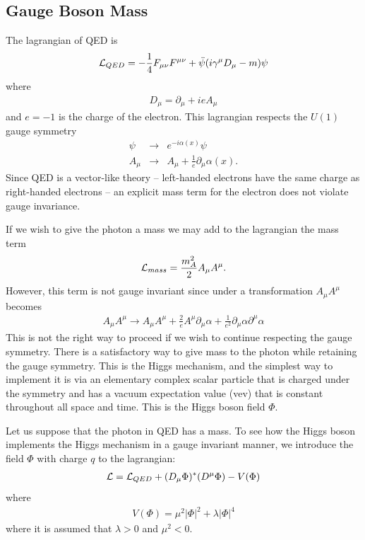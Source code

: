 \documentclass[12pt]{article}
\def\beq{\begin{eqnarray}}
\def\eeq{\end{eqnarray}}
\def\bea{\begin{eqnarray}}
\def\Dslash{\gamma^\mu D_\mu}
\begin{document}
\noindent
\subsection{Gauge Boson Mass}

The lagrangian of QED is
\beq
{\cal L}_{QED}=-\frac{1}{4}F_{\mu\nu}F^{\mu\nu}+\bar \psi (i\Dslash -m)\psi
\eeq
where 
\beq
D_\mu=\partial_\mu +ieA_\mu
\eeq
and $e=-1$ is the charge of the electron.
This lagrangian respects the $U(1)$ gauge symmetry
\bea
\psi & \to & e^{-i\alpha(x)}\psi \\
A_\mu & \to & A_\mu+\frac{1}{e}\partial_\mu \alpha(x).
\eeq
Since QED is a vector-like theory -- left-handed electrons have the same charge as right-handed electrons --  an explicit mass term for the electron does not violate gauge invariance. 

If we wish to give the photon a mass we may add to the lagrangian the mass term
\beq
{\cal L}_{mass}=\frac{m_A^2}{2}A_\mu A^\mu .
\eeq
However, this term is not gauge invariant since under a transformation $A_\mu A^\mu$ becomes
\beq
A_\mu A^\mu\to A_\mu A^\mu+\frac{2}{e}A^\mu\partial_\mu\alpha+\frac{1}{e^2}\partial_\mu \alpha\partial^\mu\alpha
\eeq
This is not the right way to proceed if we wish to continue respecting the gauge symmetry. 
There is a satisfactory way to give mass to the photon while retaining the gauge symmetry. This is the Higgs mechanism, and the simplest way to implement it is via an elementary complex scalar particle that is charged under the symmetry and has a vacuum expectation value (vev) that is constant throughout all space and time.  This is the Higgs boson field $\Phi$.

Let us suppose that the photon in QED has a mass. To see how the Higgs boson implements the Higgs mechanism in a gauge invariant manner,  we 
introduce the field $\Phi$ with charge $q$  to the lagrangian:
\beq
{\cal L}={\cal L}_{QED}+(D_\mu\Phi)^*(D^\mu \Phi)-V(\Phi)
\eeq
where 
\beq
V(\Phi)=\mu^2|\Phi|^2+\lambda |\Phi|^4
\eeq
where it is assumed that $\lambda>0$ and $\mu^2<0$.  
\end{document}
